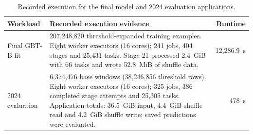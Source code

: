 \documentclass[11pt,a4paper]{article}
\begin{document}
\begin{table}[htbp]
\centering\footnotesize
\caption{Recorded execution for the final model and 2024 evaluation applications.}
\label{tab:job-evidence}
\begin{tabularx}{\linewidth}{p{28mm} X r}
\toprule
Workload & Recorded execution evidence & Runtime \\
\midrule
Final GBT-B fit & 207,248,820 threshold-expanded training examples. Eight worker executors (16 cores); 241 jobs, 404 stages and 25,431 tasks. Stage 21 processed 2.4~GiB with 66 tasks and wrote 52.8~MiB of shuffle data. & 12,286.9~s \\
2024 evaluation & 6,374,476 base windows (38,246,856 threshold rows). Eight worker executors (16 cores); 325 jobs, 386 completed stage attempts and 25,305 tasks. Application totals: 36.5~GiB input, 4.4~GiB shuffle read and 4.2~GiB shuffle write; saved predictions were evaluated. & 478~s \\
\bottomrule
\end{tabularx}
\end{table}
\end{document}
